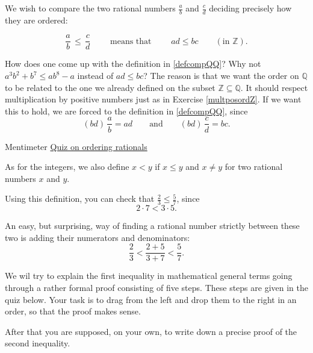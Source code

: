 We wish to compare the two rational numbers $\frac{a}{b}$ and $\frac{c}{d}$ deciding
precisely how they are ordered:

\begin{tcolorbox}\begin{equation}\label{defcompQQ}
    \frac{a}{b}\, \leq\, \frac{c}{d}\qquad \text{ means that }\qquad a d \leq b c\qquad (\text{in }\mathbb{Z}).
  \end{equation}\end{tcolorbox}

\begin{tcolorbox}
  \begin{remark}
    How does one come up with the definition in \eqref{defcompQQ}? Why not
    $a^3 b^2 + b^7 \leq a b^8 - a$ instead of $a d \leq b c$? The reason is that
    we want the order on $\mathbb{Q}$ to be related to the one we already defined on
    the subset $\mathbb{Z}\subseteq \mathbb{Q}$. It should respect multiplication by positive numbers just
    as in Exercise \ref{multposordZ}. If we want this to hold, we are forced
    to the definition in \eqref{defcompQQ}, since
    $$
      (b d)\,\frac{a}{b} = a d\qquad\text{and}\qquad (b d)\, \frac{c}{d} = b c.
    $$
  \end{remark}
\end{tcolorbox}

\begin{button}{Mentimeter}
  \href{https://www.mentimeter.com/s/cd32b78b575955460a786b8fd66da831/a0a4eb712332}{Quiz on ordering rationals}
\end{button}

As for the integers, we also define $x < y$ if $x \leq y$ and $x\neq y$ for
two rational numbers $x$ and $y$.

Using this definition, you can check that $\frac{2}{3} \leq \frac{5}{7}$, since
$$
  2\cdot 7 < 3 \cdot 5.
$$

An easy, but surprising,
way of finding a rational number strictly between these two is
adding their numerators and denominators:
$$
  \frac{2}{3} < \frac{2 + 5}{3 + 7} < \frac{5}{7}.
$$

We wil try to explain the first inequality in mathematical general terms going through a
rather formal proof consisting of five steps. These steps are
given in the quiz below. Your task is to drag from the left and drop them to the right in an order,
so that the proof makes sense.

After that you are supposed, on your own, to write down a precise proof of
the second inequality.

